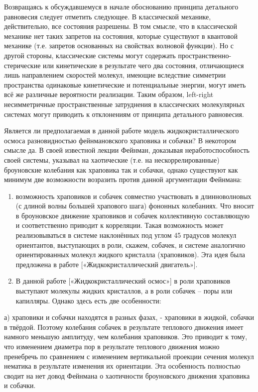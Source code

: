 \documentclass[11pt]{article}
\begin{document}
    Возвращаясь к обсуждавшемуся в начале обоснованию принципа детального
равновесия следует отметить следующее. В классической механике,
действительно, все состояния разрешены. В том смысле, что в классической
механике нет таких запретов на состояния, которые существуют в квантовой
механике (т.е. запретов основанных на свойствах волновой функции). Но с
другой стороны, классические системы могут содержать
пространственно-стерические или кинетические в результате чего два
состояния, отличающиеся лишь направлением скоростей молекул, имеющие
вследствие симметрии пространства одинаковые кинетические и
потенциальные энергии, могут иметь всё же различные вероятности
реализации. Таким образом, left-right несимметричные пространственные
затруднения в классических молекулярных системах могут приводить к
отклонениям от принципа детального равновесия.

Является ли предполагаемая в данной работе модель жидкокристаллического
осмоса разновидностью фейнмановского храповика и собачки? В некотором
смысле да. В своей известной лекции Фейнман, доказывая
неработоспособность своей системы, указывал на хаотические (т.е. на
нескоррелированные) броуновские колебания как храповика так и собачки,
однако существуют как минимум две возможности возразить против данной
аргументации Фейнмана:

\begin{enumerate}
\def\labelenumi{\arabic{enumi})}
\item
  возможность храповиков и собачек совместно участвовать в
  длинноволновых (с длиной волны большей храпового шага) фононных
  колебаниях. Что вносит в броуновское движение храповиков и собачек
  коллективную составляющую и соответственно приводит к корреляции.
  Такая возможность может реализовываться в системе наклонённых под
  углом 45 градусов молекул ориентантов, выступающих в роли, скажем,
  собачек, и системе аналогично ориентированных молекул жидкого
  кристалла (храповиков). Эта идея была предложена в работе
  {[}«Жидкокристаллический двигатель»{]}.
\item
  В данной работе {[}«Жидкокристаллический осмос»{]} в роли храповиков
  выступают молекулы жидких кристаллов, а в роли собачек -- поры или
  капилляры. Однако здесь есть две особенности:
\end{enumerate}

а) храповики и собачки находятся в разных фазах, - храповики в жидкой,
собачки в твёрдой. Поэтому колебания собачек в результате теплового
движения имеет намного меньшую амплитуду, чем колебания храповиков. Это
приводит к тому, что изменением диаметра пор в результате теплового
движения можно пренебречь по сравнением с изменением вертикальной
проекции сечения молекул нематика в результате изменения их ориентации.
Эта особенность полностью сводит на нет довод Фейнмана о хаотичности
броуновского движения храповика и собачки.
\end{document}
